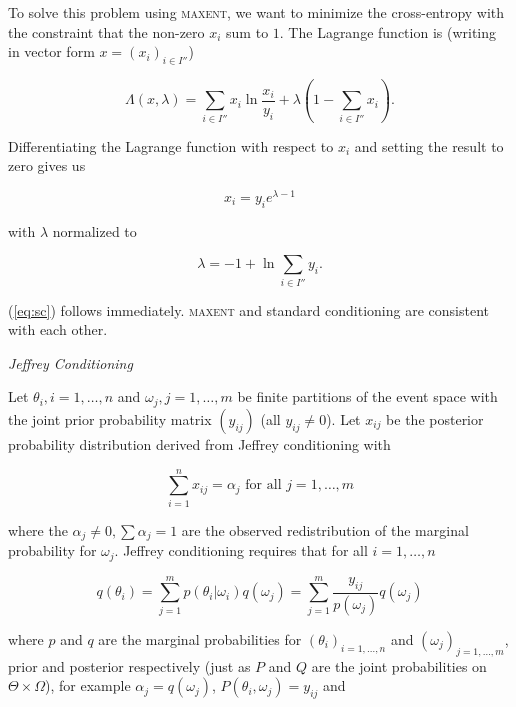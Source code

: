 \documentclass[11pt]{article}
\begin{document}
To solve this problem using \textsc{maxent}, we want to minimize the
cross-entropy with the constraint that the non-zero $x_{i}$ sum to
$1$. The Lagrange function is (writing in vector form
$x=(x_{i})_{i\in{}I''}$)

\begin{equation}
  \label{eq:sclag}
  \Lambda(x,\lambda)=\sum_{i\in{}I''}x_{i}\ln\frac{x_{i}}{y_{i}}+\lambda\left(1-\sum_{i\in{}I''}x_{i}\right).
\end{equation}

Differentiating the Lagrange function with respect to $x_{i}$ and
setting the result to zero gives us

\begin{equation}
  \label{eq:sc1}
  x_{i}=y_{i}e^{\lambda-1}
\end{equation}

with $\lambda$ normalized to

\begin{equation}
  \label{eq:sc2}
  \lambda=-1+\ln{}\sum_{i\in{}I''}y_{i}.
\end{equation}

(\ref{eq:sc}) follows immediately. \textsc{maxent} and standard
conditioning are consistent with each other.

\medskip

{\noindent}\emph{Jeffrey Conditioning}

\medskip

{\noindent}Let $\theta_{i},i=1,\ldots,n$ and
$\omega_{j},j=1,\ldots,m$ be finite partitions of the event space with
the joint prior probability matrix $(y_{ij})$ (all $y_{ij}\neq{}0$).
Let $x_{ij}$ be the posterior probability distribution derived from
Jeffrey conditioning with 

\begin{equation}
  \label{eq:jc1}
  \sum_{i=1}^{n}x_{ij}=\alpha_{j}\mbox{ for all }j=1,\ldots,m
\end{equation}

where the $\alpha_{j}\neq{}0, \sum\alpha_{j}=1$ are the observed
redistribution of the marginal probability for $\omega_{j}$. Jeffrey
conditioning requires that for all $i=1,\ldots,n$

\begin{equation}
  \label{eq:jc2}
  q(\theta_{i})=\sum_{j=1}^{m}p(\theta_{i}|\omega_{i})q(\omega_{j})=\sum_{j=1}^{m}\frac{y_{ij}}{p(\omega_{j})}q(\omega_{j})
\end{equation}

where $p$ and $q$ are the marginal probabilities for
$(\theta_{i})_{i=1,\ldots,n}$ and $(\omega_{j})_{j=1,\ldots,m}$, prior
and posterior respectively (just as $P$ and $Q$ are the joint
probabilities on $\Theta\times\Omega$), for example
$\alpha_{j}=q(\omega_{j})$, $P(\theta_{i},\omega_{j})=y_{ij}$ and
\end{document}
